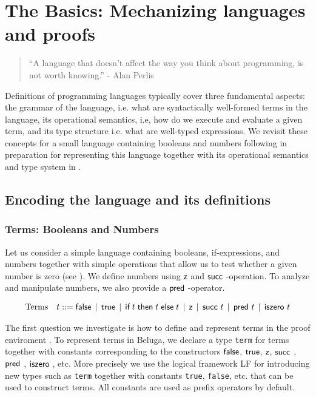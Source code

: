 \chapter{The Basics: Mechanizing languages and proofs}
\begin{quote}
``A language that doesn't affect the way you think about programming, is
not worth knowing.''
\hfill - Alan Perlis
\end{quote}

Definitions of programming languages typically cover three fundamental
aspects: the grammar of the language, i.e. what are syntactically well-formed
terms in the language, its operational semantics, i.e, how do we
execute and evaluate a given term, and its type structure i.e. what
are well-typed expressions. We revisit these concepts for a small
language containing booleans and numbers following \citep[Ch 3,Ch
8]{TAPL} in preparation for representing this language together with
its operational semantics and type system in \beluga.

\section{Encoding the language and its definitions}
\subsection{Terms: Booleans and Numbers}
Let us consider a simple language containing booleans, if-expressions,
and numbers together with simple operations that allow us to test
whether a given number is zero (see \cite[Ch 3, Fig 3-1,Fig
3-2]{TAPL}). We define numbers using $\textsf{z}$ and
$\tmsucc$-operation. To analyze and manipulate numbers, we also
provide a $\tmpred$-operator.

\[
\begin{array}{ll@{\bnfas}l}
\mbox{Terms} & t & \tmfalse \bnfalt \tmtrue \bnfalt \tmif t t t \bnfalt
\tmzero \bnfalt \tmsucc t \bnfalt \tmpred t \bnfalt \tmiszero t
\end{array}
\]

The first question we investigate is how to define and represent terms
in the proof enviroment \beluga.  To represent terms in Beluga, we
declare a type \lstinline!term! for terms together with constants
corresponding to the constructors $\textsf{false}$, $\textsf{true}$, $\textsf{z}$,
$\tmsucc$, $\tmpred$, $\tmiszero$, etc. More precisely we use the logical framework
LF \citep{Harper93jacm} for introducing new types such as
\lstinline!term! together with constants \lstinline!true!,
\lstinline!false!, etc. that can be used to construct terms. All
constants are used as prefix operators by default.

